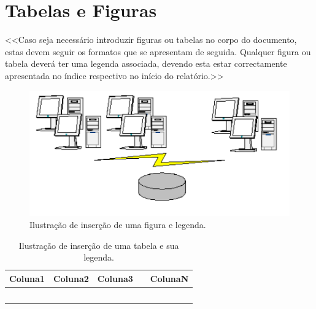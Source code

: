 \documentclass[a4paper,12pt]{scrreprt}
\begin{document}
    \section{Tabelas e Figuras}
        <<Caso seja necessário introduzir figuras ou tabelas no corpo do documento, estas devem seguir os formatos que se apresentam de seguida. Qualquer figura ou tabela deverá ter uma legenda associada, devendo esta estar correctamente apresentada no índice respectivo no início do relatório.>>
        

         \begin{figure}[!h]
            \centering
            \includegraphics[scale=0.7]{images/example.png}
            \caption{Ilustração de inserção de uma figura e legenda.}
         \end{figure}
        
        \vspace*{0.2cm}
        
        \begin{table}[!h]
            \centering
            \begin{tabular}{|p{2cm}|p{2cm}|p{2cm}|p{2cm}|p{2cm}|}
               \hline
               \rowcolor{gray!20!white}
                Coluna1 & Coluna2 & Coluna3 & & ColunaN \\
                \hline
                        &         &         & &         \\
                \hline
                        &         &         & &         \\
                \hline
                        &         &         & &         \\
                \hline
                        &         &         & &         \\
                \hline
                        &         &         & &         \\
                \hline
            \end{tabular}
            \caption{Ilustração de inserção de uma tabela e sua legenda.}
        \end{table}
        
\end{document}
